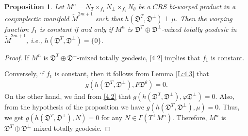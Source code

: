 \documentclass[reqno]{amsart}
\theoremstyle{plain}
\newtheorem{proposition}{Proposition}[section]
\theoremstyle{remark}
\numberwithin{equation}{section}
\begin{document}
 
\begin{proposition}\label{P:4.1}
Let $M^n=N_T\times_{f_1}N_\perp\times_{f_2}N_\theta$ be a $CRS$ bi-warped product in a cosymplectic manifold $\widetilde M^{2m+1}$ such that $h({\mathfrak{D}^{T}}, {\mathfrak{D}}^\perp)\perp\mu$. Then the warping function $f_1$ is constant if and only if $M^n$ is ${\mathfrak{D}^{T}}\oplus{\mathfrak{D}}^\perp$-mixed totally geodesic in $\widetilde M^{2m+1}$, i.e., $h({\mathfrak{D}^{T}}, {\mathfrak{D}}^\perp)=\{0\}$.
\end{proposition}
 \begin{proof} If $M^n$ is ${\mathfrak{D}^{T}}\oplus{\mathfrak{D}}^\perp$-mixed totally geodesic,  \eqref{4.2} implies that $f_1$ is constant.

Conversely, if $f_1$ is constant, then it follows from Lemma \ref{L:4.3} that
 \begin{align}\label{4.10}
g(h(\mathfrak{D}^{T}, \mathfrak{D}^\perp),F\mathfrak{D}^\theta)=0.
\end{align}
On the other hand, we find from \eqref{4.2} that
$g(h(\mathfrak{D}^{T}, \mathfrak{D}^\perp), \varphi \mathfrak{D}^\perp)=0.$
Also, from the hypothesis of the proposition we have
$g(h(\mathfrak{D}^{T}, \mathfrak{D}^\perp), \mu)=0.$
Thus, we get $g(h(\mathfrak{D}^{T}, \mathfrak{D}^\perp), N)=0$ for any $N\in\Gamma(T^\perp M^n)$. Therefore, $M^n$ is $\mathfrak{D}^{T}\oplus\mathfrak{D}^\perp$-mixed totally geodesic. 
 \end{proof}
 
\end{document}
